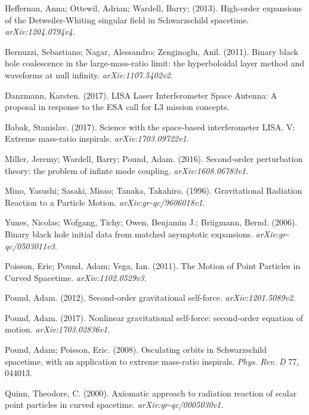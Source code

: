 Heffernan, Anna; Ottewil, Adrian; Wardell, Barry; (2013). High-order expansions of the Detweiler-Whiting singular field in Schwarzschild spacetime. {\em arXiv:1204.0794v4}.

Bernuzzi, Sebastiano; Nagar, Alessandro; Zenginoglu, Anil. (2011). Binary black hole coalescence in the large-mass-ratio limit: the hyperboloidal layer method and waveforms at null infinity. {\em arXiv:1107.5402v2}.

Danzmann, Karsten. (2017). LISA Laser Interferometer Space Antenna: A proposal in response to the ESA call for L3 mission concepts. 

Babak, Stanislav. (2017). Science with the space-based interferometer LISA. V: Extreme mass-ratio inspirals. {\em arXiv:1703.09722v1}.

Miller, Jeremy; Wardell, Barry; Pound, Adam. (2016). Second-order perturbation theory: the problem of infinte mode coupling. {\em arXiv:1608.06783v1}.

Mino, Yasushi; Sasaki, Misao; Tanaka, Takahiro. (1996). Gravitational Radiation Reaction to a Particle Motion. {\em arXiv:gr-qc/9606018v1}.

Yunes, Nicolas; Wofgang, Tichy; Owen, Benjamin J.; Briigmann, Bernd. (2006). Binary black hole initial data from matched asymptotic expansions. {\em arXiv:gr-qc/0503011v3}.

Poisson, Eric; Pound, Adam; Vega, Ian. (2011). The Motion of Point Particles in Curved Spacetime. {\em arXiv:1102.0529v3}.

Pound, Adam. (2012). Second-order gravitational self-force. {\em arXiv:1201.5089v2}.

Pound, Adam. (2017). Nonlinear gravitational self-force: second-order equation of motion. {\em arXiv:1703.02836v1}.

Pound, Adam; Poisson, Eric. (2008). Osculating orbits in Schwarzschild spacetime, with an application to extreme mass-ratio inspirals. {\em Phys. Rev. D} 77, 044013.

Quinn, Theodore, C. (2000). Axiomatic approach to radiation reaction of scalar point particles in curved spacetime. {\em arXiv:qr-qc/0005030v1}.

